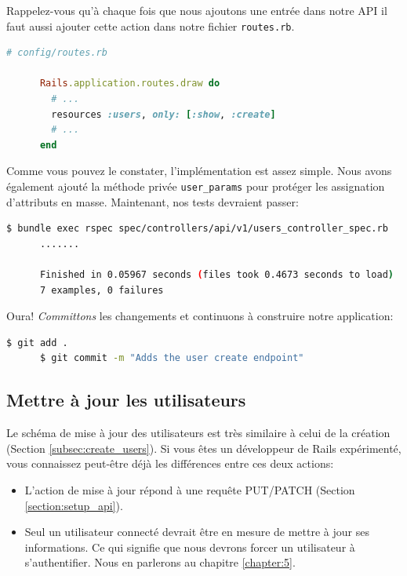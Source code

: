 \documentclass[]{report}
\begin{document}
      Rappelez-vous qu'à chaque fois que nous ajoutons une entrée dans notre API il faut aussi ajouter cette action dans notre fichier \verb|routes.rb|.

      \begin{scriptsize}
      \begin{lstlisting}[language=ruby]
      # config/routes.rb

      Rails.application.routes.draw do
        # ...
        resources :users, only: [:show, :create]
        # ...
      end
      \end{lstlisting}
      \end{scriptsize}

      Comme vous pouvez le constater, l'implémentation est assez simple. Nous avons également ajouté la méthode privée \verb|user_params| pour protéger les assignation d'attributs en masse. Maintenant, nos tests devraient passer:

      \begin{scriptsize}
      \begin{lstlisting}[language=bash]
      $ bundle exec rspec spec/controllers/api/v1/users_controller_spec.rb
      .......

      Finished in 0.05967 seconds (files took 0.4673 seconds to load)
      7 examples, 0 failures
      \end{lstlisting}
      \end{scriptsize}

      Oura! \textit{Committons} les changements et continuons à construire notre application:

      \begin{scriptsize}
      \begin{lstlisting}[language=bash]
      $ git add .
      $ git commit -m "Adds the user create endpoint"
      \end{lstlisting}
      \end{scriptsize}


    \subsection{Mettre à jour les utilisateurs}

      Le schéma de mise à jour des utilisateurs est très similaire à celui de la création (Section \ref{subsec:create_users}). Si vous êtes un développeur de Rails expérimenté, vous connaissez peut-être déjà les différences entre ces deux actions:

      \begin{itemize}
        \item L'action de mise à jour répond à une requête PUT/PATCH (Section \ref{section:setup_api}).
        \item Seul un utilisateur connecté devrait être en mesure de mettre à jour ses informations. Ce qui signifie que nous devrons forcer un utilisateur à s'authentifier. Nous en parlerons au chapitre \ref{chapter:5}.
      \end{itemize}
\end{document}
